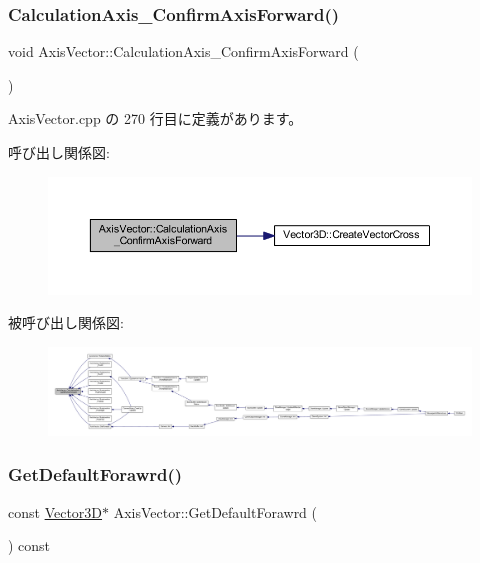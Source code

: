 \subsubsection{\texorpdfstring{Calculation\+Axis\+\_\+\+Confirm\+Axis\+Forward()}{CalculationAxis\_ConfirmAxisForward()}}
{\footnotesize\ttfamily void Axis\+Vector\+::\+Calculation\+Axis\+\_\+\+Confirm\+Axis\+Forward (\begin{DoxyParamCaption}{ }\end{DoxyParamCaption})\hspace{0.3cm}{\ttfamily [private]}}



 Axis\+Vector.\+cpp の 270 行目に定義があります。

呼び出し関係図\+:\nopagebreak
\begin{figure}[H]
\begin{center}
\leavevmode
\includegraphics[width=350pt]{class_axis_vector_a1b7758fdc7a7ef1809a7a5de1777ee65_cgraph}
\end{center}
\end{figure}
被呼び出し関係図\+:
\nopagebreak
\begin{figure}[H]
\begin{center}
\leavevmode
\includegraphics[width=350pt]{class_axis_vector_a1b7758fdc7a7ef1809a7a5de1777ee65_icgraph}
\end{center}
\end{figure}
\mbox{\label{class_axis_vector_a83ead17514eb08954dc74c0e72b6158c}} 
\subsubsection{\texorpdfstring{Get\+Default\+Forawrd()}{GetDefaultForawrd()}}
{\footnotesize\ttfamily const \mbox{\hyperlink{class_vector3_d}{Vector3D}}$\ast$ Axis\+Vector\+::\+Get\+Default\+Forawrd (\begin{DoxyParamCaption}{ }\end{DoxyParamCaption}) const\hspace{0.3cm}{\ttfamily [inline]}}



